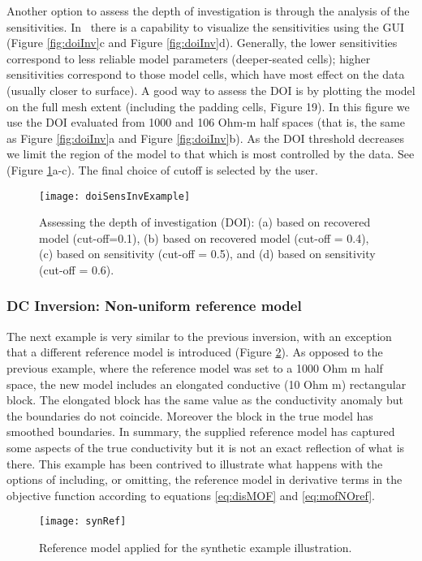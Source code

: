 Another option to assess the depth of investigation is through the analysis of the sensitivities. In \prog~there is a capability to visualize the sensitivities using the  GUI (Figure \ref{fig:doiInv}c and Figure \ref{fig:doiInv}d). Generally, the lower sensitivities correspond to less reliable model parameters (deeper-seated cells); higher sensitivities correspond to those model cells, which have most effect on the data (usually closer to surface). A good way to assess the DOI is by plotting the model on the full mesh extent (including the padding cells, Figure 19). In this figure we use the DOI evaluated from 1000 and 106 Ohm-m half spaces (that is, the same as Figure \ref{fig:doiInv}a and Figure \ref{fig:doiInv}b). As the DOI threshold decreases we limit the region of the model to that which is most controlled by the data. See (Figure \ref{fig:doiInvSens}a-c). The final choice of cutoff is selected by the user.
%
\begin{figure}
\centering
\texttt{[image: doiSensInvExample]}
\caption{Assessing the depth of investigation (DOI): (a) based on recovered model (cut-off=0.1), (b) based on recovered model (cut-off = 0.4), (c) based on sensitivity (cut-off = 0.5), and (d) based on sensitivity (cut-off = 0.6).}
\label{fig:doiInvSens}
\end{figure}

\subsubsection{DC Inversion: Non-uniform reference model}
The next example is very similar to the previous inversion, with an exception that a different reference model is introduced (Figure \ref{fig:exRef}). As opposed to the previous example, where the reference model was set to a 1000 Ohm m half space, the new model includes an elongated conductive (10 Ohm m) rectangular block. The elongated block has the same value as the conductivity anomaly but the boundaries do not coincide. Moreover the block in the true model has smoothed boundaries. In summary, the supplied reference model has captured some aspects of the true conductivity but it is not an exact reflection of what is there. This example has been contrived to illustrate what happens with the options of including, or omitting, the reference model in derivative terms in the objective function according to equations \ref{eq:disMOF} and \ref{eq:mofNOref}.
%
\begin{figure}
\centering
\texttt{[image: synRef]}
\caption{Reference model applied for the synthetic example illustration.}
\label{fig:exRef}
\end{figure}

